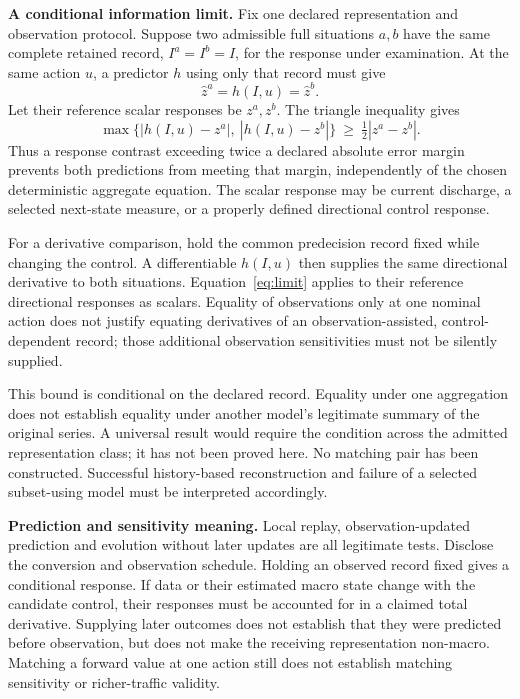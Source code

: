 \documentclass[11pt]{article}
\begin{document}
\textbf{A conditional information limit.} Fix one declared representation and observation protocol. Suppose two admissible full situations $a,b$ have the same complete retained record, $I^a=I^b=I$, for the response under examination. At the same action $u$, a predictor $h$ using only that record must give
\begin{equation}
 \widehat z^a=h(I,u)=\widehat z^b.
\end{equation}
Let their reference scalar responses be $z^a,z^b$. The triangle inequality gives
\begin{equation}
 \max\bigl\{|h(I,u)-z^a|,\ |h(I,u)-z^b|\bigr\}
 \ \geq\ \tfrac12 |z^a-z^b|.
 \label{eq:limit}
\end{equation}
Thus a response contrast exceeding twice a declared absolute error margin prevents both predictions from meeting that margin, independently of the chosen deterministic aggregate equation. The scalar response may be current discharge, a selected next-state measure, or a properly defined directional control response.

For a derivative comparison, hold the common predecision record fixed while changing the control. A differentiable $h(I,u)$ then supplies the same directional derivative to both situations. Equation~\eqref{eq:limit} applies to their reference directional responses as scalars. Equality of observations only at one nominal action does not justify equating derivatives of an observation-assisted, control-dependent record; those additional observation sensitivities must not be silently supplied.

This bound is conditional on the declared record. Equality under one aggregation does not establish equality under another model's legitimate summary of the original series. A universal result would require the condition across the admitted representation class; it has not been proved here. No matching pair has been constructed. Successful history-based reconstruction and failure of a selected subset-using model must be interpreted accordingly.

\textbf{Prediction and sensitivity meaning.} Local replay, observation-updated prediction and evolution without later updates are all legitimate tests. Disclose the conversion and observation schedule. Holding an observed record fixed gives a conditional response. If data or their estimated macro state change with the candidate control, their responses must be accounted for in a claimed total derivative. Supplying later outcomes does not establish that they were predicted before observation, but does not make the receiving representation non-macro. Matching a forward value at one action still does not establish matching sensitivity or richer-traffic validity.
\end{document}
